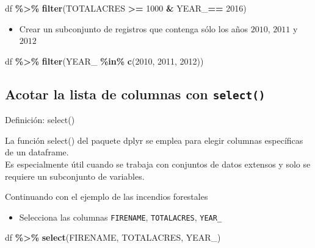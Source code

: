 \documentclass[
]{book}
\newenvironment{Shaded}{\begin{snugshade}}{\end{snugshade}}
\newcommand{\DecValTok}[1]{\textcolor[rgb]{0.00,0.00,0.81}{#1}}
\newcommand{\FunctionTok}[1]{\textcolor[rgb]{0.13,0.29,0.53}{\textbf{#1}}}
\newcommand{\NormalTok}[1]{#1}
\newcommand{\SpecialCharTok}[1]{\textcolor[rgb]{0.81,0.36,0.00}{\textbf{#1}}}
\providecommand{\tightlist}{%
  \setlength{\itemsep}{0pt}\setlength{\parskip}{0pt}}
\begin{document}
\begin{Shaded}
\begin{Highlighting}[]
\NormalTok{df }\SpecialCharTok{\%\textgreater{}\%} 
  \FunctionTok{filter}\NormalTok{(TOTALACRES }\SpecialCharTok{\textgreater{}=} \DecValTok{1000} \SpecialCharTok{\&}\NormalTok{ YEAR\_}\SpecialCharTok{==} \DecValTok{2016}\NormalTok{)}
\end{Highlighting}
\end{Shaded}

\begin{itemize}
\tightlist
\item
  Crear un subconjunto de registros que contenga sólo los años \(2010\), \(2011\) y \(2012\)
\end{itemize}

\begin{Shaded}
\begin{Highlighting}[]
\NormalTok{df }\SpecialCharTok{\%\textgreater{}\%} 
  \FunctionTok{filter}\NormalTok{(YEAR\_ }\SpecialCharTok{\%in\%} \FunctionTok{c}\NormalTok{(}\DecValTok{2010}\NormalTok{, }\DecValTok{2011}\NormalTok{, }\DecValTok{2012}\NormalTok{))}
\end{Highlighting}
\end{Shaded}

\subsection{\texorpdfstring{Acotar la lista de columnas con \texttt{select()}}{Acotar la lista de columnas con select()}}\label{acotar-la-lista-de-columnas-con-select}

{} Definición: select()

La función select() del paquete dplyr se emplea para
elegir columnas específicas de un dataframe.\\
Es especialmente útil cuando se trabaja con conjuntos de datos extensos y solo se requiere un subconjunto de variables.

Continuando con el ejemplo de las incendios forestales

\begin{itemize}
\tightlist
\item
  Selecciona las columnas \texttt{FIRENAME}, \texttt{TOTALACRES}, \texttt{YEAR\_}
\end{itemize}

\begin{Shaded}
\begin{Highlighting}[]
\NormalTok{df }\SpecialCharTok{\%\textgreater{}\%} 
  \FunctionTok{select}\NormalTok{(FIRENAME, TOTALACRES, YEAR\_)}
\end{Highlighting}
\end{Shaded}
\end{document}
